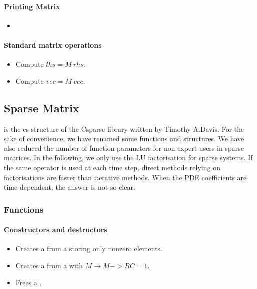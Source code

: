 \paragraph{Printing Matrix}
\begin{itemize}
\item {}
\end{itemize}

\paragraph{Standard matrix operations}
\begin{itemize}
\item {}
  \sshortdescribe Compute $ lhs=M \ rhs$.
\item {}
  \sshortdescribe Compute $ vec=M \ vec$.
\end{itemize}


\subsection{Sparse Matrix}

 is the cs structure of the Csparse library written by
Timothy A.Davis.  For the sake of convenience, we have renamed some functions
and structures. We have also reduced the number of function parameters for non
expert users in sparse matrices.  In the following, we only use the LU
factorisation for sparse systems. If the same operator is used at each time
step, direct methods relying on factorisations are faster than iterative
methods. When the PDE coefficients are time dependent, the answer is not so
clear.

\subsubsection{Functions}
\paragraph{Constructors and destructors}
\begin{itemize}
\item {}
  \sshortdescribe Creates a  from  a
   storing only nonzero elements.
\item {}
  \sshortdescribe Creates a  from  a
   with $M\rightarrow M->RC =1$.
\item {}
  \sshortdescribe Frees a .
\end{itemize}

